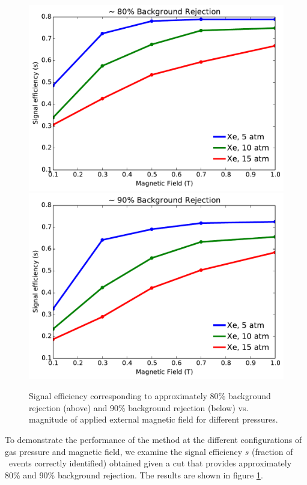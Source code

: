\documentclass{JINST}
\begin{document}
\begin{figure}[!htb]
	\centering
	\includegraphics[scale=0.6]{fig/eff_vs_b_80.pdf} \\
	\includegraphics[scale=0.6]{fig/eff_vs_b_90.pdf}
	\caption{\label{fig_config}Signal efficiency corresponding to approximately 80\% background rejection (above) and 90\% background rejection (below) vs. magnitude of applied external magnetic field for different pressures.}
\end{figure}

To demonstrate the performance of the method at the different configurations of gas pressure and magnetic 
field, we examine the signal efficiency $s$ (fraction of \bbonu\ events correctly identified) obtained 
given a cut that provides approximately 80\% and 90\% background rejection.  The results are shown in figure 
\ref{fig_config}.
\end{document}
